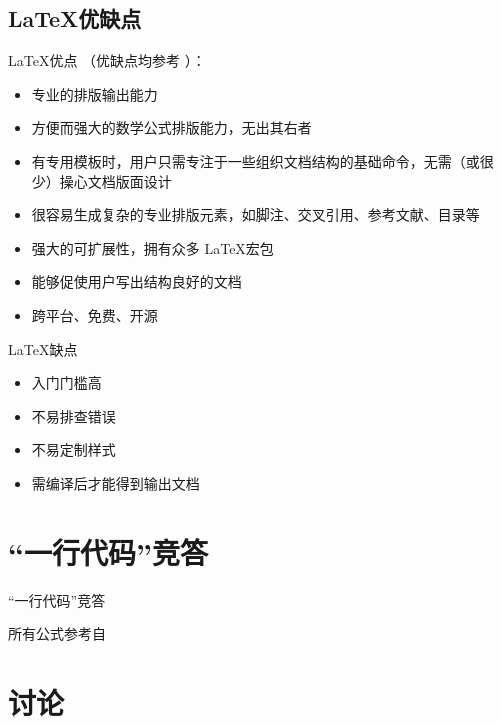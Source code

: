 \documentclass{beamer}
\begin{document}
\subsection{\LaTeX 优缺点}
\begin{frame}{\LaTeX 优点}
（优缺点均参考 \cite{lshort-cn}）：
\begin{itemize}
\item 专业的排版输出能力
\item 方便而强大的数学公式排版能力，无出其右者
\item 有专用模板时，用户只需专注于一些组织文档结构的基础命令，无需（或很少）操心文档版面设计
\item 很容易生成复杂的专业排版元素，如脚注、交叉引用、参考文献、目录等
\item 强大的可扩展性，拥有众多 \LaTeX 宏包
\item 能够促使用户写出结构良好的文档
\item 跨平台、免费、开源
\end{itemize}
\end{frame}

\begin{frame}{\LaTeX 缺点}
\begin{itemize}
\item 入门门槛高
\item 不易排查错误
\item 不易定制样式
\item 需编译后才能得到输出文档
\end{itemize}
\end{frame}

\section[竞答]{“一行代码”竞答}
\begin{frame}[allowframebreaks]{“一行代码”竞答}

所有公式参考自 \cites{Zorich,Kostrikin}



\end{frame}

\section[讨论]{讨论}
\end{document}
